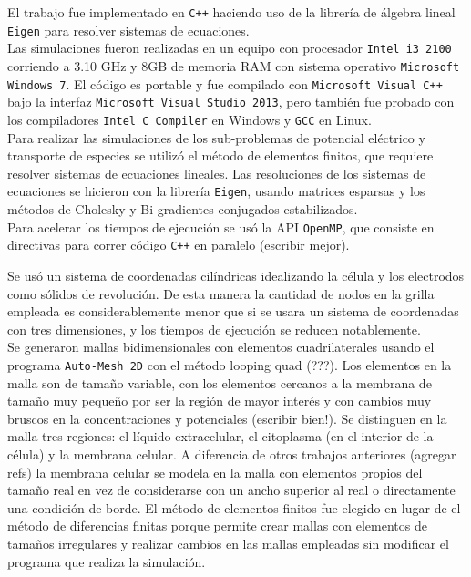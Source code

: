 El trabajo fue implementado en \texttt{C++} haciendo uso de la librería de álgebra lineal \texttt{Eigen} para resolver sistemas de ecuaciones.\\ %

Las simulaciones fueron realizadas en un equipo con procesador \texttt{Intel i3 2100} corriendo a 3.10 GHz y 8GB de memoria RAM con sistema operativo \texttt{Microsoft Windows 7}. El código es portable y fue compilado con \texttt{Microsoft Visual C++} bajo la interfaz \texttt{Microsoft Visual Studio 2013}, pero también fue probado con los compiladores \texttt{Intel C Compiler} en Windows y \texttt{GCC} en Linux.\\

Para realizar las simulaciones de los sub-problemas de potencial eléctrico y transporte de especies se utilizó el método de elementos finitos, que requiere resolver sistemas de ecuaciones lineales. Las resoluciones de los sistemas de ecuaciones se hicieron con la librería \texttt{Eigen}, usando matrices esparsas y los métodos de Cholesky y Bi-gradientes conjugados estabilizados.\\

Para acelerar los tiempos de ejecución se usó la API \texttt{OpenMP}, que consiste en directivas para correr código \texttt{C++} en paralelo (escribir mejor). 

Se usó un sistema de coordenadas cilíndricas idealizando la célula y los electrodos como sólidos de revolución. De esta manera la cantidad de nodos en la grilla empleada es considerablemente menor que si se usara un sistema de coordenadas con tres dimensiones, y los tiempos de ejecución se reducen notablemente.\\

Se generaron mallas bidimensionales con elementos cuadrilaterales usando el programa \texttt{Auto-Mesh 2D} con el método looping quad (???). Los elementos en la malla son de tamaño variable, con los elementos cercanos a la membrana de tamaño muy pequeño por ser la región de mayor interés y con cambios muy bruscos en la concentraciones y potenciales (escribir bien!). Se distinguen en la malla tres regiones: el líquido extracelular, el citoplasma (en el interior de la célula) y la membrana celular. A diferencia de otros trabajos anteriores (agregar refs) la membrana celular se modela en la malla con elementos propios del tamaño real en vez de considerarse con un ancho superior al real o directamente una condición de borde. El método de elementos finitos fue elegido en lugar de el método de diferencias finitas porque permite crear mallas con elementos de tamaños irregulares y realizar cambios en las mallas empleadas sin modificar el programa que realiza la simulación.\\

